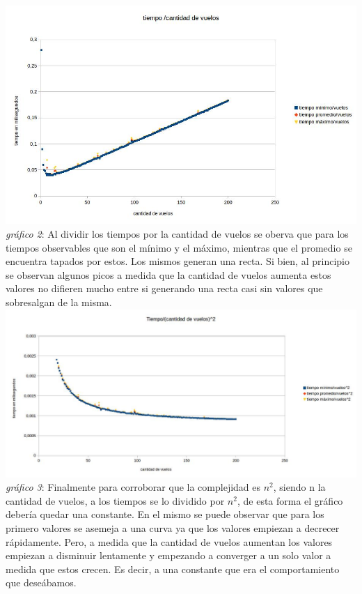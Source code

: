 \documentclass[a4paper]{article}
\begin{document}
\includegraphics[width=\textwidth,height=\textheight,keepaspectratio
]{divididon.jpg}\newline
\textit{gráfico 2}: Al dividir los tiempos por la cantidad de vuelos se oberva que para los tiempos observables que son el mínimo y el máximo, mientras que el promedio se encuentra tapados por estos. Los mismos generan una recta. Si bien, al principio se observan algunos picos a medida que la cantidad de vuelos aumenta estos valores no difieren mucho entre si generando una recta casi sin valores que sobresalgan de la misma.\newline
\includegraphics[width=\textwidth,height=\textheight,keepaspectratio
]{dividonporn.jpg}\newline
\textit{gráfico 3}: Finalmente para corroborar que la complejidad es $n^{2}$, siendo n la cantidad de vuelos, a los tiempos se lo dividido por $n^{2}$, de esta forma el gráfico debería quedar una constante. En el mismo se puede observar que para los primero valores se asemeja a una curva ya que los valores empiezan a decrecer rápidamente. Pero, a medida que la cantidad de vuelos aumentan los valores empiezan a disminuir lentamente y empezando a converger a un solo valor a medida que estos crecen. Es decir, a una constante que era el comportamiento que deseábamos.
\end{document}
